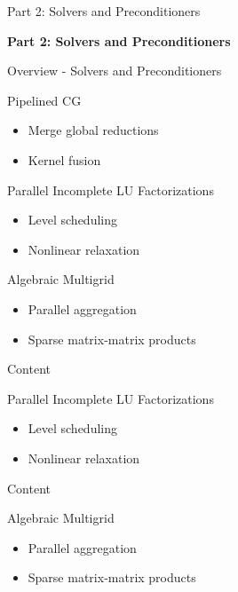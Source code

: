 
\begin{frame}{Part 2: Solvers and Preconditioners}
 \begin{center}
  {\Large \textbf{Part 2: Solvers and Preconditioners}}
 \end{center}
\end{frame}


\begin{frame}{Overview - Solvers and Preconditioners}

 \begin{block}{Pipelined CG}
  \begin{itemize}
   \item Merge global reductions
   \item Kernel fusion
  \end{itemize}
 \end{block}

 \begin{block}{Parallel Incomplete LU Factorizations}
  \begin{itemize}
   \item Level scheduling
   \item Nonlinear relaxation
  \end{itemize}
 \end{block}

 \begin{block}{Algebraic Multigrid}
  \begin{itemize}
   \item Parallel aggregation
   \item Sparse matrix-matrix products
  \end{itemize}
 \end{block}

\end{frame}




\begin{frame}{Content}
 \begin{block}{Parallel Incomplete LU Factorizations}
  \begin{itemize}
   \item Level scheduling
   \item Nonlinear relaxation
  \end{itemize}
 \end{block}
\end{frame}



\begin{frame}{Content}
 \begin{block}{Algebraic Multigrid}
  \begin{itemize}
   \item Parallel aggregation
   \item Sparse matrix-matrix products
  \end{itemize}
 \end{block}
\end{frame}





